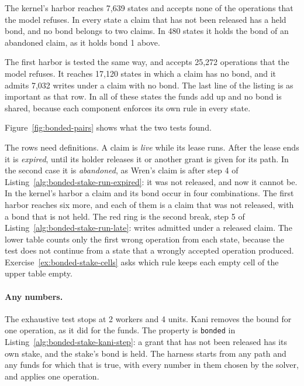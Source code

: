 
The kernel's harbor reaches 7,639 states and accepts none of the
operations that the model refuses. In every state a claim that has not
been released has a held bond, and no bond belongs to two claims. In 480
states it holds the bond of an abandoned claim, as it holds bond 1 above.

The first harbor is tested the same way, and accepts 25,272 operations
that the model refuses. It reaches 17,120 states in which a claim has no
bond, and it admits 7,032 writes under a claim with no bond. The last line
of the listing is as important as that row. In all of these states the
funds add up and no bond is shared, because each component enforces its
own rule in every state.

Figure~\ref{fig:bonded-pairs} shows what the two tests found.



The rows need definitions. A claim is \emph{live} while its lease runs.
After the lease ends it is \emph{expired}, until its holder releases it or
another grant is given for its path. In the second case it is
\emph{abandoned}, as Wren's claim is after step 4 of
Listing~\ref{alg:bonded-stake-run-expired}: it was not released, and now
it cannot be. In the kernel's harbor a claim and its bond occur in four
combinations. The first harbor reaches six more, and each of them is a
claim that was not released, with a bond that is not held. The red ring is
the second break, step 5 of Listing~\ref{alg:bonded-stake-run-late}:
writes admitted under a released claim. The lower table counts only the
first wrong operation from each state, because the test does not continue
from a state that a wrongly accepted operation produced.
Exercise~\ref{ex:bonded-stake-cells} asks which rule keeps each empty cell
of the upper table empty.

\paragraph{Any numbers.}
The exhaustive test stops at 2 workers and 4 units. Kani removes the bound
for one operation, as it did for the funds. The property is
\texttt{bonded} in Listing~\ref{alg:bonded-stake-kani-step}: a grant that
has not been released has its own stake, and the stake's bond is held. The
harness starts from any path and any funds for which that is true, with
every number in them chosen by the solver, and applies one operation.

